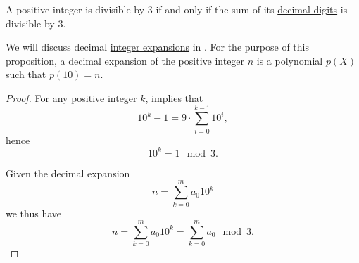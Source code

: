 \begin{proposition}\label{thm:division_by_three_digits}
  A positive integer is divisible by \( 3 \) if and only if the sum of its \hyperref[def:positional_number_system/decimal]{decimal digits} is divisible by \( 3 \).
\end{proposition}
\begin{comments}
  \item We will discuss decimal \hyperref[def:integer_radix_expansion]{integer expansions} in . For the purpose of this proposition, a decimal expansion of the positive integer \( n \) is a polynomial \( p(X) \) such that \( p(10) = n \).
\end{comments}
\begin{proof}
  For any positive integer \( k \),  implies that
  \begin{equation*}
    10^k - 1 = 9 \cdot \sum_{i=0}^{k-1} 10^i,
  \end{equation*}
  hence
  \begin{equation*}
    10^k = 1 \mod 3.
  \end{equation*}

  Given the decimal expansion
  \begin{equation*}
    n = \sum_{k=0}^m a_0 10^k
  \end{equation*}
  we thus have
  \begin{equation*}
    n = \sum_{k=0}^m a_0 10^k = \sum_{k=0}^m a_0 \mod 3.
  \end{equation*}
\end{proof}

